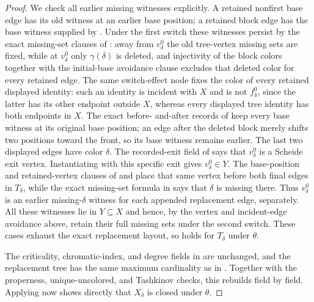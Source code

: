 \begin{proof}
We check all earlier missing witnesses explicitly.  A retained nonfirst base
edge has its old witness at an earlier base position; a retained block edge
has the base witness supplied by
.  Under the first switch these
witnesses persist by the exact missing-set clauses of
: away from $v^0_\delta$ the old
tree-vertex missing sets are fixed, while at $v^0_\delta$ only
$\gamma(\delta)$ is deleted, and injectivity of the block colors together
with the initial-base avoidance clause excludes that deleted color for every
retained edge.  The same switch-effect node fixes the color of every retained
displayed identity: such an identity is incident with $X$ and is not
$f^0_\delta$, since the latter has its other endpoint outside $X$, whereas
every displayed tree identity has both endpoints in $X$.  The exact before-
and-after records of  keep every base witness
at its original base position; an edge after the deleted block merely shifts
two positions toward the front, so its base witness remains earlier.  The
last two displayed edges have color $\delta$.  The recorded-exit field of
 says that $v^0_\delta$ is a Scheide exit
vertex.  Instantiating  with this
specific exit gives $v^0_\delta\in Y$.  The base-position and
retained-vertex clauses of  and
 place that same vertex before both final
edges in $T_\delta$, while the exact missing-set formula in
 says that $\delta$ is missing there.
Thus $v^0_\delta$ is an earlier missing-$\delta$ witness for each appended
replacement edge, separately.  All these
witnesses lie in $Y\subseteq X$ and hence, by the vertex and incident-edge
avoidance above, retain their full missing sets under the second switch.
These cases exhaust the exact replacement layout, so
 holds for $T_\delta$ under $\theta$.

The criticality, chromatic-index, and degree fields in
 are unchanged, and the replacement tree has the same
maximum cardinality as in .  Together
with the properness, unique-uncolored, and Tashkinov checks, this rebuilds
 field by field.  Applying
 now shows directly that $X_\delta$ is
closed under $\theta$.


\end{proof}
